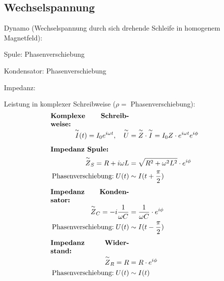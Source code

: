 \subsection{Wechselspannung}
    Dynamo (Wechselspannung durch sich drehende Schleife in homogenem Magnetfeld):


    Spule: Phasenverschiebung 

    Kondensator: Phasenverschiebung

    Impedanz:


    Leistung in komplexer Schreibweise ($\rho = $ Phasenverschiebung):
    \begin{align*}
        \parbox{4cm}{\textbf{Komplexe Schreibweise:}}\\
        \overset{\sim}{I}(t) = I_0 e^{i \omega t}, \quad \overset{\sim}{U} &= \overset{\sim}{Z} \cdot \overset{\sim}{I} = I_0 Z \cdot e^{i \omega t} e^{i \phi}
        \\[0.5em]
        \parbox{4cm}{\textbf{Impedanz Spule:}}\\
        \overset{\sim}{Z}_S = R + i \omega L &= \sqrt{R^2 + \omega^2 L ^2} \cdot e^{i \phi}\\
        \text{Phasenverschiebung:} \; U(t) &\sim I(t + \frac{\pi}{2})
        \\[0.5em]
        \parbox{4cm}{\textbf{Impedanz Kondensator:}}\\
        \overset{\sim}{Z}_C = - i\frac{1}{\omega C} &= \frac{1}{\omega C} \cdot e^{i \phi}\\
        \text{Phasenverschiebung:} \; U(t) &\sim I(t - \frac{\pi}{2})
        \\[0.5em]
        \parbox{4cm}{\textbf{Impedanz Widerstand:}}\\
        \overset{\sim}{Z}_R = R &= R \cdot e^{i \phi}\\
        \text{Phasenverschiebung:} \; U(t) &\sim I(t)
    \end{align*}